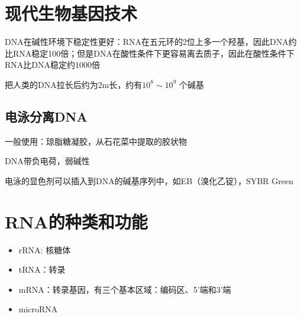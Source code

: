 \section{现代生物基因技术}%
\label{sec:现代生物基因技术}
\begin{notation}
    DNA在碱性环境下稳定性更好：RNA在五元环的2位上多一个羟基，因此DNA约比RNA稳定100倍；但是DNA在酸性条件下更容易离去质子，因此在酸性条件下RNA比DNA稳定约1000倍
\end{notation}
\begin{notation}
    把人类的DNA拉长后约为2m长，约有$10^{8}\sim 10^{9}$ 个碱基
\end{notation}
\subsection{电泳分离DNA}%
\label{sub:电泳分离DNA}
一般使用：琼脂糖凝胶，从石花菜中提取的胶状物

\begin{notation}
    DNA带负电荷，弱碱性
\end{notation}
电泳的显色剂可以插入到DNA的碱基序列中，如EB（溴化乙锭），SYBR Green
\section{RNA的种类和功能}%
\label{sec:RNA的种类和功能}
\begin{itemize}
    \item rRNA: 核糖体
    \item tRNA：转录
    \item mRNA：转录基因，有三个基本区域：编码区、5'端和3'端
    \item microRNA
\end{itemize}
